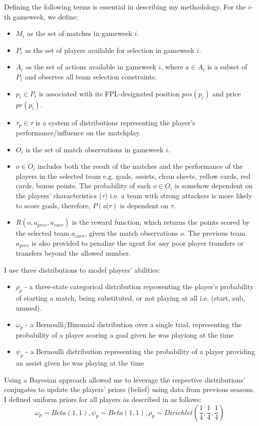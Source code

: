 Defining the following terms is essential in describing my methodology. For the $i$-th gameweek, we define:
\begin{itemize}
    \item $M_i$ as the set of matches in gameweek $i$.
    \item $P_i$ as the set of players available for selection in gameweek $i$.
    \item $A_i$ as the set of actions available in gameweek $i$, where $a \in A_i$ is a subset of $P_i$ and observes all team selection constraints.
    \item $p_i \in P_i$ is associated with its FPL-designated position $pos(p_i)$ and price $pr(p_i)$.
    \item $\tau_p \in \tau$ is a system of distributions representing the player's performance/influence on the matchplay.
    \item $O_i$ is the set of match observations in gameweek $i$.
    \item $o \in O_i$ includes both the result of the matches and the performance of the players in the selected team e.g. goals, assists, clean sheets, yellow cards, red cards, bonus points. The probability of each $o \in O_i$ is somehow dependent on the players' characteristics ($\tau$) i.e. a team with strong attackers is more likely to score goals, therefore, $P(o | \tau)$ is dependent on $\tau$.
    \item $R(o, a_{prev}, a_{curr})$ is the reward function, which returns the points scored by the selected team $a_{curr}$, given the match observations $o$. The previous team $a_{prev}$ is also provided to penalize the agent for any poor player transfers or transfers beyond the allowed number.
\end{itemize}

I use three distributions to model players' abilities:
\begin{itemize}
    \item $\rho_p$ - a three-state categorical distribution representing the player's probability of starting a match, being substituted, or not playing at all i.e. (start, sub, unused).
    \item $\omega_p$ - a Bernoulli/Binomial distribution over a single trial, representing the probability of a player scoring a goal given he was playiong at the time
    \item $\psi_p$ - a Bernoulli distribution representing the probability of a player providing an assist given he was playing at the time
\end{itemize}
Using a Bayesian approach allowed me to leverage the respective distributions' conjugates to update the players' priors (belief) using data from previous seasons. I defined uniform priors for all players as described in \cite{matthews2012} as follows: $$\omega_p \sim Beta(1, 1), \psi_p \sim Beta(1, 1),  \rho_p \sim Dirichlet(\frac{1}{4}, \frac{1}{4}, \frac{1}{4})$$

